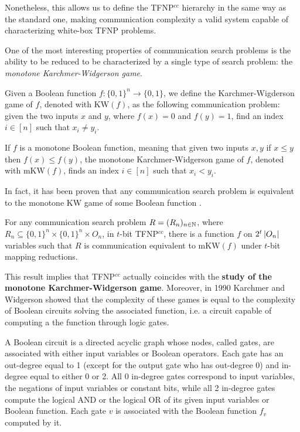 Nonetheless, this allows us to define the \textsf{TFNP}$^{cc}$ hierarchy in the same way as the standard one, making communication complexity a valid system capable of characterizing white-box \textsf{TFNP problems}.

One of the most interesting properties of communication search problems is the ability to be reduced to be characterized by a single type of search problem: the \textit{monotone Karchmer-Widgerson game}.

\begin{definition}
    Given a Boolean function $f : \{0, 1\}^n \to \{0, 1\}$, we define the Karchmer-Wigderson game of $f$, denoted with $\mathrm{KW}(f)$, as the following communication problem: given the two inputs $x$ and $y$, where $f(x) = 0$ and $f(y) = 1$, find an index  $i \in [n]$ such that $x_i \neq y_i$.

    If $f$ is a monotone Boolean function, meaning that given two inputs $x,y$ if $x \leq y$ then $f(x) \leq f(y)$, the monotone Karchmer-Widgerson game of $f$, denoted with $\mathrm{mKW}(f)$, finds an index $i \in [n]$ such that $x_i < y_i$.
\end{definition}

In fact, it has been proven  that any communication search problem is equivalent to the monotone KW game of some Boolean function \cite{span_programs,adventures_monotone_tfnp}.

\begin{lemma}
    For any communication search problem $R = (R_n)_{n \in \mathbb{N}}$, where $R_n \subseteq \{0,1\}^n \times \{0,1\}^n \times O_n$, in $t$-bit \textsf{TFNP}$^{cc}$, there is a function $f$ on $2^t\left|O_n\right|$ variables such that $R$ is communication equivalent to $\mathrm{mKW}(f)$ under $t$-bit mapping reductions.
\end{lemma}

This result implies that \textsf{TFNP}$^{cc}$ actually coincides with the \textbf{study of the monotone Karchmer-Widgerson game}. Moreover, in 1990 Karchmer and Widgerson \cite{kw_games} showed that the complexity of these games is equal to the complexity of Boolean circuits solving the associated function, i.e. a circuit capable of computing a the function through logic gates.

\begin{definition}
    A Boolean circuit is a directed acyclic graph whose nodes, called gates, are associated with either input variables or Boolean operators. Each gate has an out-degree equal to 1 (except for the output gate who has out-degree 0) and in-degree equal to either 0 or 2. All 0 in-degree gates correspond to input variables, the negations of input variables or constant bits, while all 2 in-degree gates compute the logical AND or the logical OR of its given input variables or Boolean function. Each gate $v$ is associated with the Boolean function $f_v$ computed by it.
\end{definition}

